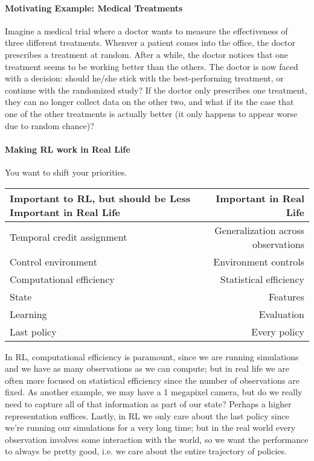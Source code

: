 \documentclass[12pt]{article}
\begin{document}
\paragraph{Motivating Example: Medical Treatments} Imagine a medical trial where a doctor wants to measure the effectiveness of three different treatments. Whenver a patient comes into the office, the doctor prescribes a treatment at random. After a while, the doctor notices that one treatment seems to be working better than the others. The doctor is now faced with a decision: should he/she stick with the best-performing treatment, or continue with the randomized study? If the doctor only prescribes one treatment, they can no longer collect data on the other two, and what if its the case that one of the other treatments is actually better (it only happens to appear worse due to random chance)?

\paragraph{Making RL work in Real Life} You want to shift your priorities.

\begin{tabular}{l | r}
  Important to RL, but should be Less Important in Real Life & Important in Real                                                                Life \\
  \hline
  Temporal credit assignment & Generalization across observations \\
  Control environment & Environment controls \\
  Computational efficiency & Statistical efficiency \\
  State & Features \\
  Learning & Evaluation \\
  Last policy & Every policy
\end{tabular}

In RL, computational efficiency is paramount, since we are running simulations and we have as many observations as we can compute; but in real life we are often more focused on statistical efficiency since the number of observations are fixed.
As another example, we may have a 1 megapixel camera, but do we really need to capture all of that information as part of our state? Perhaps a higher representation suffices. Lastly, in RL we only care about the last policy since we're running our simulations for a very long time; but in the real world every observation involves some interaction with the world, so we want the performance to always be pretty good, i.e. we care about the entire trajectory of policies.
\end{document}
